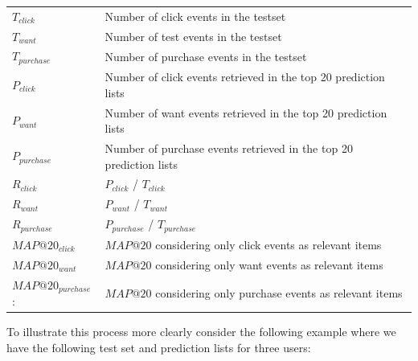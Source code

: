 \begin{table}[H]
\label{metric-explanation}
	\begin{tabular}{ll}
	\toprule
	$T_{click}$	 	 		& 	Number of click events in the testset \\
	$T_{want}$				&	Number of test events in the testset \\
	$T_{purchase}$	 		&	Number of purchase events in the testset \\
	$P_{click}$		 		&	Number of click events retrieved in the top 20 prediction lists \\
	$P_{want}$		 		&	Number of want events retrieved in the top 20 prediction lists \\
	$P_{purchase}$  		&	Number of purchase events retrieved in the top 20 prediction lists \\
	$R_{click}$				&	$P_{click}$ / $T_{click}$ \\
	$R_{want}$		 		&	$P_{want}$ / $T_{want}$  \\
	$R_{purchase}$	 		&	$P_{purchase}$ / $T_{purchase}$ \\
	$MAP@20_{click}$ 		&	$MAP@20$ considering only click events as relevant items \\
	$MAP@20_{want}$  		&	$MAP@20$ considering only want events as relevant items \\
	$MAP@20_{purchase}$: 	& 	$MAP@20$ considering only purchase events as relevant items \\
	\bottomrule
	\end{tabular}
\end{table}

To illustrate this process more clearly consider the following example where we have
the following test set and prediction lists for three users:


